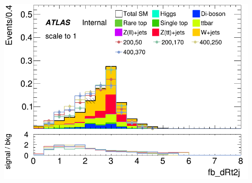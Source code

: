 \documentclass[usenames,dvipsnames]{beamer}
\begin{document}
\begin{frame}
\begin{minipage}{0.32\textwidth}
        \includegraphics[width=\textwidth]{graphics/LH_met_sig/LH_fb_dRt2j_norm.png}
    \end{minipage}
    
    \vspace{0.5cm} %


\end{frame}
\end{document}
